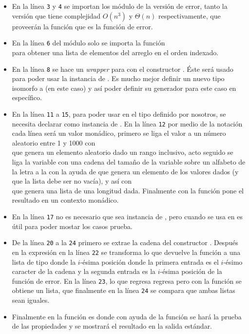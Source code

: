 \begin{itemize}
\item En la línea \texttt{3} y \texttt{4} se importan los módulo de la versión de error, tanto
la versión que tiene complejidad $O(n^3)$ y $\Theta(n)$ respectivamente, que proveerán la función
 que es la función de error.
\item En la línea \texttt{6} del módulo  solo se importa la función\\
 para obtener una lista de elementos del arreglo en el orden
indexado.
\item En la línea \texttt{8} se hace un \emph{wrapper} para  con el
constructor . Éste será usado para poder usar la instancia de .
Es mucho mejor definir un nuevo tipo isomorfo a (en este caso)  y así poder definir
su generador para este caso en específico.
\item En la línea \texttt{11} a \texttt{15}, para poder usar  en el tipo
 definido por nosotros, se necesita declarar como instancia de .
En la línea \texttt{12} por medio de la notación  cada línea será un valor monádico,
primero se liga el valor  a un número aleatorio entre 1 y 1000 con\\
 que genera un elemento aleatorio dado un rango
inclusivo, acto seguido se liga la variable  con una cadena del tamaño de la variable
 sobre un alfabeto de la letra  a la  con la ayuda de
 que genera un elemento de los valores dados (y que la lista debe
ser no vacía), y así con\\
 que genera una lista de una longitud dada. Finalmente
con la función  pone el resultado en un contexto monádico.
\item En la línea \texttt{17} no es necesario que sea instancia de , pero cuando se usa
 en  es útil para poder mostar los casos prueba.
\item De la línea \texttt{20} a la \texttt{24} primero se extrae la cadena  del
constructor . Después en la expresión  en la línea
\texttt{22} se transforma lo que devuelve la función  a una lista de tipo
 donde la $i$-ésima posición donde la primera entrada es el $i$-ésimo
caracter de la cadena y la segunda entrada es la $i$-ésima posición de la función de error.
En la línea \texttt{23}, lo que regresa  regresa
 pero con la función  se obtiene un lista, que
finalmente en la línea \texttt{24} se compara que ambas listas sean iguales.
\item Finalmente en la función  es donde con ayuda de la función 
se hará la prueba de las propiedades y se mostrará el resultado en la salida estándar.
\end{itemize}

